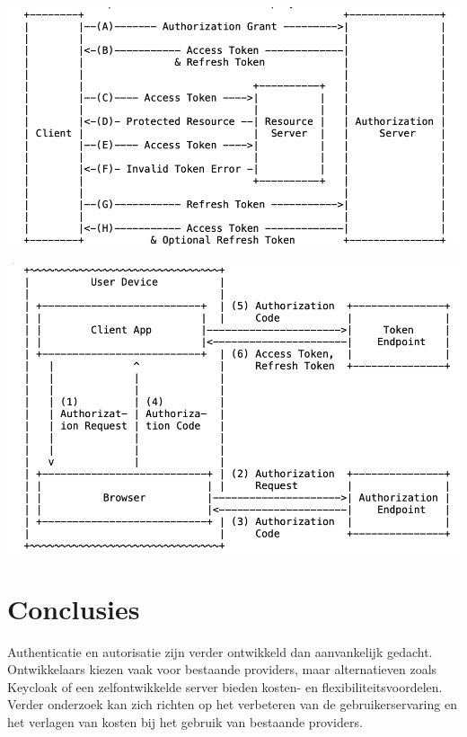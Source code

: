 \documentclass[a0,portrait]{hogent-poster}
\begin{document}
\begin{multicols}{2}
\begin{center}
  \captionsetup{type=figure}
  \includegraphics[width=1.0\linewidth]{graphics/oauth2.png}
\end{center}
\begin{center}
  \captionsetup{type=figure}
  \includegraphics[width=1.0\linewidth]{graphics/oauth2_native.png}
\end{center}

\section{Conclusies}

Authenticatie en autorisatie zijn verder ontwikkeld dan aanvankelijk gedacht. Ontwikkelaars kiezen vaak voor bestaande providers, maar alternatieven
zoals Keycloak of een zelfontwikkelde server bieden kosten- en flexibiliteitsvoordelen. Verder onderzoek kan zich richten op het verbeteren van de
gebruikerservaring en het verlagen van kosten bij het gebruik van bestaande providers.


\end{multicols}
\end{document}
